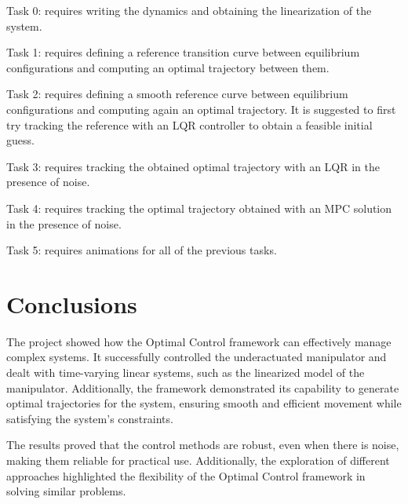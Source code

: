 \documentclass[a4paper,11pt,oneside]{book}
\begin{document}
Task 0: requires writing the dynamics and obtaining the linearization of the system.

Task 1: requires defining a reference transition curve between equilibrium configurations and computing an optimal trajectory between them.

Task 2: requires defining a smooth reference curve between equilibrium configurations and computing again an optimal trajectory. It is suggested to first try tracking the reference with an LQR controller to obtain a feasible initial guess.

Task 3: requires tracking the obtained optimal trajectory with an LQR in the presence of noise.

Task 4: requires tracking the optimal trajectory obtained with an MPC solution in the presence of noise.

Task 5: requires animations for all of the previous tasks.
















\chapter*{Conclusions}

The project showed how the Optimal Control framework can effectively manage complex systems. It successfully controlled the underactuated manipulator and dealt with time-varying linear systems, such as the linearized model of the manipulator. Additionally, the framework demonstrated its capability to generate optimal trajectories for the system, ensuring smooth and efficient movement while satisfying the system's constraints.

The results proved that the control methods are robust, even when there is noise, making them reliable for practical use. Additionally, the exploration of different approaches highlighted the flexibility of the Optimal Control framework in solving similar problems.

{}

\nocite{*}
\end{document}

